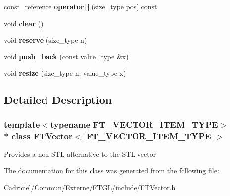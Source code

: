 \begin{DoxyCompactItemize}
\item 
const\+\_\+reference {\bfseries operator\mbox{[}$\,$\mbox{]}} (size\+\_\+type pos) const \hypertarget{class_f_t_vector_a3da21c8d8b89ab5f0ad2d4db5fef89c5}{}\label{class_f_t_vector_a3da21c8d8b89ab5f0ad2d4db5fef89c5}

\item 
void {\bfseries clear} ()\hypertarget{class_f_t_vector_a67f25dc63f17ffa9d7cc12c11175e900}{}\label{class_f_t_vector_a67f25dc63f17ffa9d7cc12c11175e900}

\item 
void {\bfseries reserve} (size\+\_\+type n)\hypertarget{class_f_t_vector_a148e3c1116a60d9c3edd787936e0df27}{}\label{class_f_t_vector_a148e3c1116a60d9c3edd787936e0df27}

\item 
void {\bfseries push\+\_\+back} (const value\+\_\+type \&x)\hypertarget{class_f_t_vector_a791d950e681867166b7afaca20c72722}{}\label{class_f_t_vector_a791d950e681867166b7afaca20c72722}

\item 
void {\bfseries resize} (size\+\_\+type n, value\+\_\+type x)\hypertarget{class_f_t_vector_a44869ccb17027d3880c5b5054c325dba}{}\label{class_f_t_vector_a44869ccb17027d3880c5b5054c325dba}

\end{DoxyCompactItemize}


\subsection{Detailed Description}
\subsubsection*{template$<$typename F\+T\+\_\+\+V\+E\+C\+T\+O\+R\+\_\+\+I\+T\+E\+M\+\_\+\+T\+Y\+PE$>$\\*
class F\+T\+Vector$<$ F\+T\+\_\+\+V\+E\+C\+T\+O\+R\+\_\+\+I\+T\+E\+M\+\_\+\+T\+Y\+P\+E $>$}

Provides a non-\/\+S\+TL alternative to the S\+TL vector 

The documentation for this class was generated from the following file\+:\begin{DoxyCompactItemize}
\item 
Cadriciel/\+Commun/\+Externe/\+F\+T\+G\+L/include/F\+T\+Vector.\+h\end{DoxyCompactItemize}
